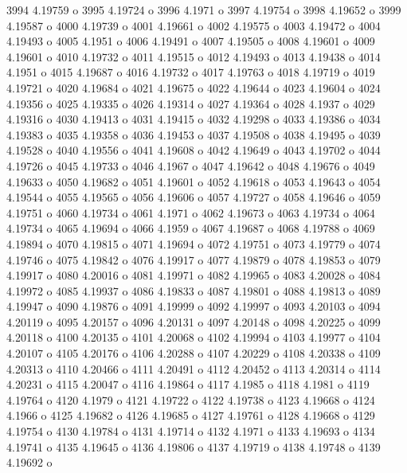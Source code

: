  3994  4.19759  o
 3995  4.19724  o
 3996  4.1971  o
 3997  4.19754  o
 3998  4.19652  o
 3999  4.19587  o
 4000  4.19739  o
 4001  4.19661  o
 4002  4.19575  o
 4003  4.19472  o
 4004  4.19493  o
 4005  4.1951  o
 4006  4.19491  o
 4007  4.19505  o
 4008  4.19601  o
 4009  4.19601  o
 4010  4.19732  o
 4011  4.19515  o
 4012  4.19493  o
 4013  4.19438  o
 4014  4.1951  o
 4015  4.19687  o
 4016  4.19732  o
 4017  4.19763  o
 4018  4.19719  o
 4019  4.19721  o
 4020  4.19684  o
 4021  4.19675  o
 4022  4.19644  o
 4023  4.19604  o
 4024  4.19356  o
 4025  4.19335  o
 4026  4.19314  o
 4027  4.19364  o
 4028  4.1937  o
 4029  4.19316  o
 4030  4.19413  o
 4031  4.19415  o
 4032  4.19298  o
 4033  4.19386  o
 4034  4.19383  o
 4035  4.19358  o
 4036  4.19453  o
 4037  4.19508  o
 4038  4.19495  o
 4039  4.19528  o
 4040  4.19556  o
 4041  4.19608  o
 4042  4.19649  o
 4043  4.19702  o
 4044  4.19726  o
 4045  4.19733  o
 4046  4.1967  o
 4047  4.19642  o
 4048  4.19676  o
 4049  4.19633  o
 4050  4.19682  o
 4051  4.19601  o
 4052  4.19618  o
 4053  4.19643  o
 4054  4.19544  o
 4055  4.19565  o
 4056  4.19606  o
 4057  4.19727  o
 4058  4.19646  o
 4059  4.19751  o
 4060  4.19734  o
 4061  4.1971  o
 4062  4.19673  o
 4063  4.19734  o
 4064  4.19734  o
 4065  4.19694  o
 4066  4.1959  o
 4067  4.19687  o
 4068  4.19788  o
 4069  4.19894  o
 4070  4.19815  o
 4071  4.19694  o
 4072  4.19751  o
 4073  4.19779  o
 4074  4.19746  o
 4075  4.19842  o
 4076  4.19917  o
 4077  4.19879  o
 4078  4.19853  o
 4079  4.19917  o
 4080  4.20016  o
 4081  4.19971  o
 4082  4.19965  o
 4083  4.20028  o
 4084  4.19972  o
 4085  4.19937  o
 4086  4.19833  o
 4087  4.19801  o
 4088  4.19813  o
 4089  4.19947  o
 4090  4.19876  o
 4091  4.19999  o
 4092  4.19997  o
 4093  4.20103  o
 4094  4.20119  o
 4095  4.20157  o
 4096  4.20131  o
 4097  4.20148  o
 4098  4.20225  o
 4099  4.20118  o
 4100  4.20135  o
 4101  4.20068  o
 4102  4.19994  o
 4103  4.19977  o
 4104  4.20107  o
 4105  4.20176  o
 4106  4.20288  o
 4107  4.20229  o
 4108  4.20338  o
 4109  4.20313  o
 4110  4.20466  o
 4111  4.20491  o
 4112  4.20452  o
 4113  4.20314  o
 4114  4.20231  o
 4115  4.20047  o
 4116  4.19864  o
 4117  4.1985  o
 4118  4.1981  o
 4119  4.19764  o
 4120  4.1979  o
 4121  4.19722  o
 4122  4.19738  o
 4123  4.19668  o
 4124  4.1966  o
 4125  4.19682  o
 4126  4.19685  o
 4127  4.19761  o
 4128  4.19668  o
 4129  4.19754  o
 4130  4.19784  o
 4131  4.19714  o
 4132  4.1971  o
 4133  4.19693  o
 4134  4.19741  o
 4135  4.19645  o
 4136  4.19806  o
 4137  4.19719  o
 4138  4.19748  o
 4139  4.19692  o
